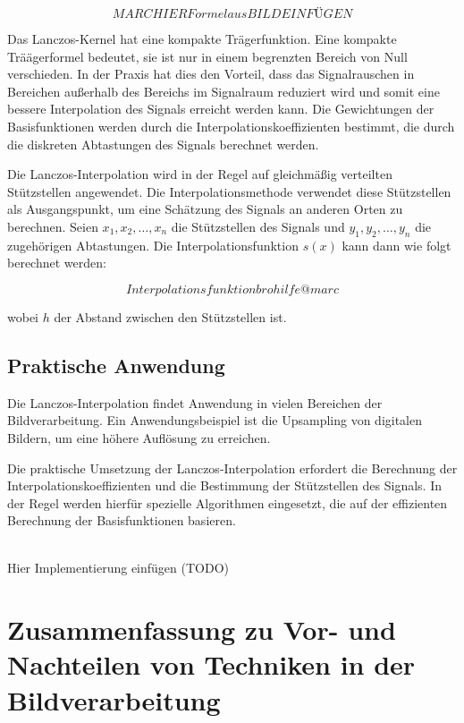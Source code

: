\begin{equation}
MARC HIER Formel aus BILD EINFÜGEN
\end{equation}

Das Lanczos-Kernel hat eine kompakte Trägerfunktion.
Eine kompakte Träägerformel bedeutet, sie ist nur in einem begrenzten Bereich von Null verschieden. 
In der Praxis hat dies den Vorteil, dass das Signalrauschen in Bereichen außerhalb des Bereichs im Signalraum reduziert wird und somit eine bessere Interpolation des Signals erreicht werden kann.
Die Gewichtungen der Basisfunktionen werden durch die Interpolationskoeffizienten bestimmt, die durch die diskreten Abtastungen des Signals berechnet werden.

Die Lanczos-Interpolation wird in der Regel auf gleichmäßig verteilten Stützstellen angewendet. 
Die Interpolationsmethode verwendet diese Stützstellen als Ausgangspunkt, um eine Schätzung des Signals an anderen Orten zu berechnen. 
Seien $x_1, x_2, \ldots, x_n$ die Stützstellen des Signals und $y_1, y_2, \ldots, y_n$ die zugehörigen Abtastungen. Die Interpolationsfunktion $s(x)$ kann dann wie folgt berechnet werden:

\begin{equation}
Interpolationsfunktion bro hilfe @marc
\end{equation}

wobei $h$ der Abstand zwischen den Stützstellen ist.

\subsection{Praktische Anwendung}

Die Lanczos-Interpolation findet Anwendung in vielen Bereichen der Bildverarbeitung. 
Ein Anwendungsbeispiel ist die Upsampling von digitalen Bildern, um eine höhere Auflösung zu erreichen.

Die praktische Umsetzung der Lanczos-Interpolation erfordert die Berechnung der Interpolationskoeffizienten und die Bestimmung der Stützstellen des Signals. 
In der Regel werden hierfür spezielle Algorithmen eingesetzt, die auf der effizienten Berechnung der Basisfunktionen basieren.

\\Hier Implementierung einfügen (TODO) 

\section{Zusammenfassung zu Vor- und Nachteilen von Techniken in der Bildverarbeitung}

